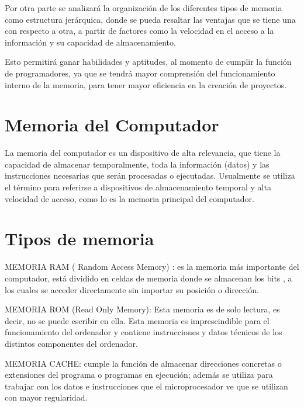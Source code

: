 \documentclass{article}
\begin{document}
\vspace{0.5cm}

Por otra parte se analizará la organización de los diferentes tipos de memoria como estructura jerárquica, donde se pueda resaltar las ventajas que se tiene una con respecto a otra, a partir de factores como la velocidad  en el acceso a la información y su capacidad de almacenamiento.
\vspace{0.5cm}

Esto permitirá ganar habilidades y aptitudes, al momento de cumplir la función de programadores, ya que se tendrá mayor comprensión del funcionamiento interno de la memoria, para tener mayor eficiencia en la creación de proyectos. \\

\vspace{0.5cm}

\section{Memoria del Computador}
La memoria del computador es un dispositivo de alta relevancia, que tiene la capacidad de almacenar temporalmente, toda la información (datos)  y  las instrucciones necesarias que serán procesadas o ejecutadas. Usualmente se utiliza el término para referirse a dispositivos de almacenamiento temporal y alta velocidad de acceso, como lo es la memoria principal del computador.\cite{ecuredwebsite}

\section{Tipos de memoria } \label{contenido}
MEMORIA RAM ( Random Access Memory) : es la memoria más importante del computador, está dividido en celdas de memoria donde se almacenan los bits , a los cuales  se acceder directamente sin importar su posición o dirección.
	
\vspace{0.5cm}
MEMORIA ROM (Read Only Memory): Esta memoria es de solo lectura, es decir, no se puede escribir en ella. Esta memoria es imprescindible para el funcionamiento del ordenador y contiene instrucciones y datos técnicos de los distintos componentes del ordenador.
    
\vspace{0.5cm}

MEMORIA CACHE: cumple la función de almacenar direcciones concretas o extensiones del programa o programas en ejecución; además se utiliza para trabajar con los datos e instrucciones que el microprocesador ve que se utilizan con mayor regularidad.
\end{document}
